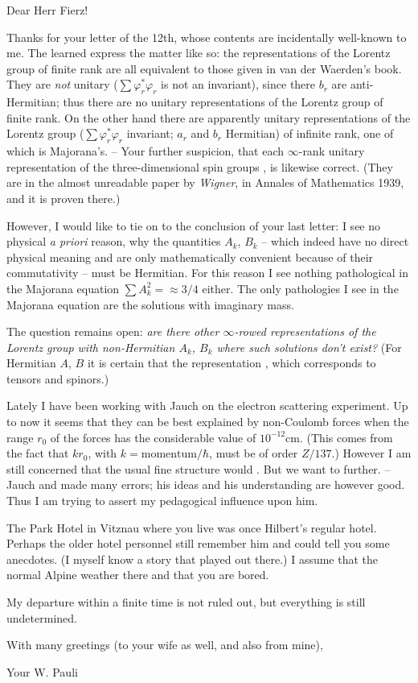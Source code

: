 \date{July 17, 1940}

Dear Herr Fierz!

Thanks for your letter of the 12th, whose contents are incidentally well-known to me. The learned express the matter like so: the representations of the Lorentz group of finite rank are all equivalent to those given in van der Waerden's book. They are \textit{not} unitary ($\sum\varphi_r^*\varphi_r$ is not an invariant), since there $b_r$ are anti-Hermitian; thus there are no unitary representations of the Lorentz group of finite rank. On the other hand there are apparently unitary representations of the Lorentz group ($\sum\varphi_r^*\varphi_r$ invariant; $a_r$ and $b_r$ Hermitian) of infinite rank, one of which is Majorana's. -- Your further suspicion, that each $\infty$-rank unitary representation of the three-dimensional spin groups , is likewise correct. (They are in the almost unreadable paper by \textit{Wigner}, in Annales of Mathematics 1939, and it is proven there.)

However, I would like to tie on to the conclusion of your last letter: I see no physical \textit{a priori} reason, why the quantities $A_k$, $B_k$ -- which indeed have no direct physical meaning and are only mathematically convenient because of their commutativity -- must be Hermitian. For this reason I see nothing pathological in the Majorana equation $\sum A_k^2 = \approx 3/4$ either. The only pathologies I see in the Majorana equation are the solutions with imaginary mass.

The question remains open: \textit{are there other $\infty$-rowed representations of the Lorentz group with non-Hermitian $A_k$, $B_k$ where such solutions don't exist?} (For Hermitian $A$, $B$ it is certain that the representation , which corresponds to tensors and spinors.)

Lately I have been working with Jauch on the electron scattering experiment. Up to now it seems that they can be best explained by non-Coulomb forces when the range $r_0$ of the forces has the considerable value of $10^{-12}\text{cm}$. (This comes from the fact that $kr_0$, with $k=\text{momentum}/\hbar$, must be of order $Z/137$.) However I am still concerned that the usual fine structure would . But we want to  further. -- Jauch  and made many errors; his ideas and his understanding are however good. Thus I am trying to assert my pedagogical influence upon him.

The Park Hotel in Vitznau where you live was once Hilbert's regular hotel. Perhaps the older hotel personnel still remember him and could tell you some anecdotes. (I myself know a story that played out there.) I assume that the normal Alpine weather  there and that you are bored.

My departure within a finite time is not ruled out, but everything is still undetermined.

With many greetings (to your wife as well, and also from mine),

Your W. Pauli

